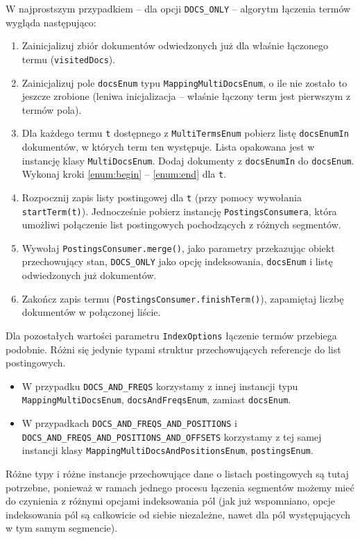 W najprostszym przypadkiem -- dla opcji \texttt{DOCS\_ONLY} -- algorytm łączenia termów wygląda następująco:
\begin{enumerate}
 \item Zainicjalizuj zbiór dokumentów odwiedzonych już dla właśnie łączonego termu (\texttt{visitedDocs}).
 \item Zainicjalizuj pole \texttt{docsEnum} typu \texttt{MappingMultiDocsEnum}, o ile nie zostało to jeszcze zrobione (leniwa inicjalizacja -- właśnie łączony term jest pierwszym z termów pola).
 \item Dla każdego termu \texttt{t} dostępnego z \texttt{MultiTermsEnum} pobierz listę \texttt{docsEnumIn} dokumentów, w których term ten występuje. Lista opakowana jest w instancję klasy \texttt{MultiDocsEnum}. Dodaj dokumenty z \texttt{docsEnumIn} do \texttt{docsEnum}. Wykonaj kroki \ref{enum:begin} -- \ref{enum:end} dla \texttt{t}.
 \item \label{enum:begin} Rozpocznij zapis listy postingowej dla \texttt{t} (przy pomocy wywołania \texttt{startTerm(t)}). Jednocześnie pobierz instancję \texttt{PostingsConsumera}, która umożliwi połączenie list postingowych pochodzących z różnych segmentów.
 \item Wywołaj \texttt{PostingsConsumer.merge()}, jako parametry przekazując obiekt przechowujący stan, \texttt{DOCS\_ONLY} jako opcję indeksowania, \texttt{docsEnum} i listę odwiedzonych już dokumentów.
 \item \label{enum:end} Zakończ zapis termu (\texttt{PostingsConsumer.finishTerm()}), zapamiętaj liczbę dokumentów w połączonej liście.
\end{enumerate}

Dla pozostałych wartości parametru \texttt{IndexOptions} łączenie termów przebiega podobnie. Różni się jedynie typami struktur przechowujących referencje do list postingowych.
\begin{itemize}
 \item W przypadku \texttt{DOCS\_AND\_FREQS} korzystamy z innej instancji typu \texttt{MappingMultiDocsEnum}, \texttt{docsAndFreqsEnum}, zamiast \texttt{docsEnum}.
 \item W przypadkach \texttt{DOCS\_AND\_FREQS\_AND\_POSITIONS} i \texttt{DOCS\_AND\_FREQS\_AND\_POSITIONS\_AND\_OFFSETS} korzystamy z tej samej instancji klasy \texttt{MappingMultiDocsAndPositionsEnum}, \texttt{postingsEnum}.
\end{itemize}
Różne typy i różne instancje przechowujące dane o listach postingowych są tutaj potrzebne, ponieważ w ramach jednego procesu łączenia segmentów możemy mieć do czynienia z różnymi opcjami indeksowania pól (jak już wspomniano, opcje indeksowania pól są całkowicie od siebie niezależne, nawet dla pól występujących w tym samym segmencie).

